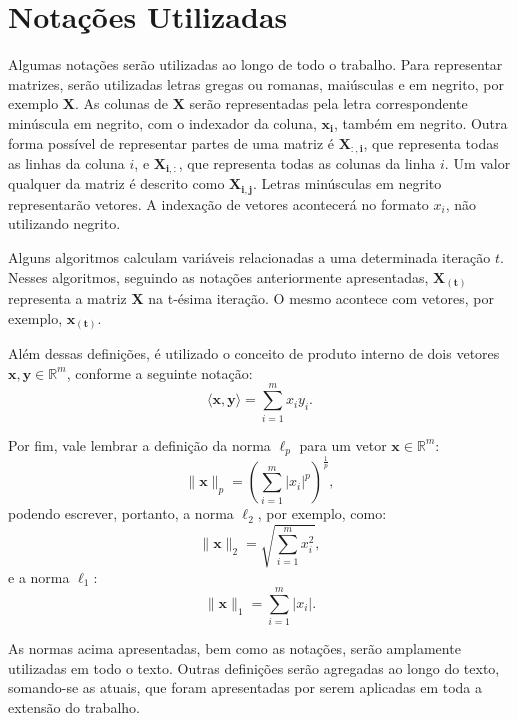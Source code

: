 \documentclass[cic,tc]{iiufrgs}
\renewcommand{\vec}[1]{\bm{#1}}
\newcommand{\mat}[1]{\bm{#1}}
\begin{document}
\section{Notações Utilizadas}
Algumas notações serão utilizadas ao longo de todo o trabalho.
Para representar matrizes, serão utilizadas letras gregas ou romanas, 
maiúsculas e em negrito, por exemplo $\mat{X}$.
As colunas de $\mat{X}$ serão representadas pela letra correspondente 
minúscula em negrito, com o indexador da coluna, $\vec{x_i}$, também em negrito.
Outra forma possível de representar partes de uma matriz é $\mat{X_{:,i}}$,
que representa todas as linhas da coluna $i$, e $\mat{X_{i,:}}$, que representa 
todas as colunas da linha $i$.
Um valor qualquer da matriz é descrito como $\mat{X_{i,j}}$.
Letras minúsculas em negrito representarão vetores.
A indexação de vetores acontecerá no formato $x_i$, não utilizando negrito. %

Alguns algoritmos calculam variáveis relacionadas a uma determinada iteração $t$.
Nesses algoritmos, seguindo as notações anteriormente apresentadas, $\mat{X_{(t)}}$ 
representa a matriz $\mat{X}$ na t-ésima iteração.
O mesmo acontece com vetores, por exemplo, $\vec{x_{(t)}}$.

Além dessas definições, é utilizado o conceito de produto interno 
de dois vetores $\vec{x}, \vec{y} \in \mathbb{R}^m$, 
conforme a seguinte notação:
\begin{equation*}
    \langle \vec{x}, \vec{y} \rangle = \sum_{i=1}^m {x_i y_i}.
\end{equation*}

Por fim, vale lembrar a definição da norma $\ell_p$ para um vetor $\vec{x} \in \mathbb{R}^m$:
\begin{equation*}
    \lVert \vec{x} \rVert_p = 
    \left( \sum_{i=1}^m {|x_i|^p} \right)^{\frac{1}{p}}, 
\end{equation*}
podendo escrever, portanto, a norma $\ell_2$, por exemplo, como:
\begin{equation*}
    \lVert \vec{x} \rVert_2 = 
    \sqrt{\sum_{i=1}^m {x_i^2}},
\end{equation*}
e a norma $\ell_1$:
\begin{equation*}
    \lVert \vec{x} \rVert_1 = 
    \sum_{i=1}^m {|x_i|}.
\end{equation*}

As normas acima apresentadas, bem como as notações, serão amplamente utilizadas
em todo o texto. 
Outras definições serão agregadas ao longo do texto, somando-se as atuais, 
que foram apresentadas por serem aplicadas em toda a extensão do trabalho.
\end{document}
